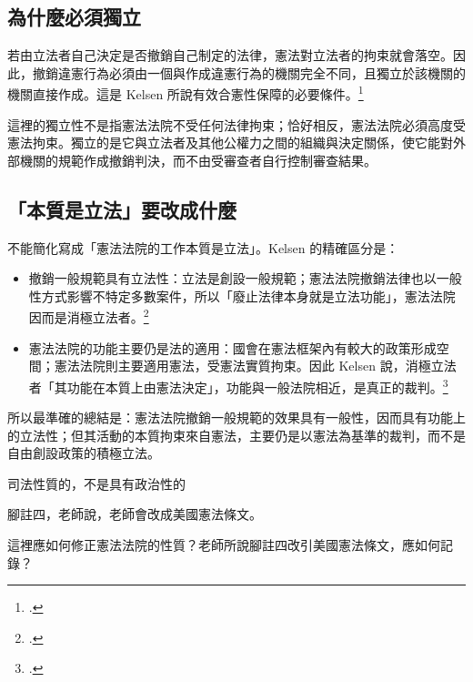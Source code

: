 \subsection{為什麼必須獨立}

若由立法者自己決定是否撤銷自己制定的法律，憲法對立法者的拘束就會落空。因此，撤銷違憲行為必須由一個與作成違憲行為的機關完全不同，且獨立於該機關的機關直接作成。這是 Kelsen 所說有效合憲性保障的必要條件。\footcites[42]{kelsen2015}[50]{kelsen1929}

這裡的獨立性不是指憲法法院不受任何法律拘束；恰好相反，憲法法院必須高度受憲法拘束。獨立的是它與立法者及其他公權力之間的組織與決定關係，使它能對外部機關的規範作成撤銷判決，而不由受審查者自行控制審查結果。

\subsection{「本質是立法」要改成什麼}

不能簡化寫成「憲法法院的工作本質是立法」。Kelsen 的精確區分是：

\begin{itemize}
\tightlist
\item
  撤銷一般規範具有立法性：立法是創設一般規範；憲法法院撤銷法律也以一般性方式影響不特定多數案件，所以「廢止法律本身就是立法功能」，憲法法院因而是消極立法者。\footcites[46]{kelsen2015}[54]{kelsen1929}
\item
  憲法法院的功能主要仍是法的適用：國會在憲法框架內有較大的政策形成空間；憲法法院則主要適用憲法，受憲法實質拘束。因此 Kelsen 說，消極立法者「其功能在本質上由憲法決定」，功能與一般法院相近，是真正的裁判。\footcites[47]{kelsen2015}[56]{kelsen1929}
\end{itemize}

所以最準確的總結是：憲法法院撤銷一般規範的效果具有一般性，因而具有功能上的立法性；但其活動的本質拘束來自憲法，主要仍是以憲法為基準的裁判，而不是自由創設政策的積極立法。


\begin{qaprompt}
司法性質的，不是具有政治性的

腳註四，老師說，老師會改成美國憲法條文。
\end{qaprompt}

\begin{qaquestion}
這裡應如何修正憲法法院的性質？老師所說腳註四改引美國憲法條文，應如何記錄？
\end{qaquestion}

